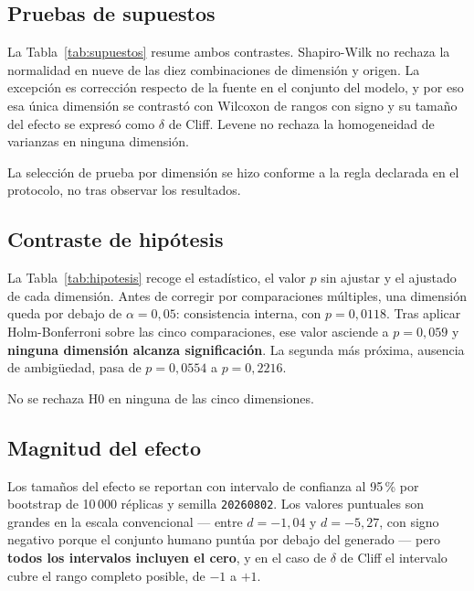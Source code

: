 \documentclass[11pt,a4paper]{article}
\begin{document}
\subsection{Pruebas de supuestos}



La Tabla~\ref{tab:supuestos} resume ambos contrastes. Shapiro-Wilk no rechaza la normalidad en nueve de las diez combinaciones de dimensi\'on
y origen. La excepci\'on es correcci\'on respecto de la fuente en el conjunto del
modelo, y por eso esa \'unica dimensi\'on se contrast\'o con Wilcoxon de rangos con
signo y su tama\~no del efecto se expres\'o como $\delta$ de Cliff. Levene no rechaza la
homogeneidad de varianzas en ninguna dimensi\'on.

La selecci\'on de prueba por dimensi\'on se hizo conforme a la regla declarada en el
protocolo, no tras observar los resultados.

\subsection{Contraste de hip\'otesis}



La Tabla~\ref{tab:hipotesis} recoge el estad\'istico, el valor $p$ sin ajustar y el ajustado de cada dimensi\'on. Antes de corregir por comparaciones m\'ultiples, una dimensi\'on queda por debajo de
$\alpha = 0{,}05$: consistencia interna, con $p = 0{,}0118$. Tras aplicar
Holm-Bonferroni sobre las cinco comparaciones, ese valor asciende a $p = 0{,}059$ y
\textbf{ninguna dimensi\'on alcanza significaci\'on}. La segunda m\'as pr\'oxima,
ausencia de ambig\"uedad, pasa de $p = 0{,}0554$ a $p = 0{,}2216$.

No se rechaza H0 en ninguna de las cinco dimensiones.

\subsection{Magnitud del efecto}

Los tama\~nos del efecto se reportan con intervalo de confianza al 95\,\% por bootstrap
de 10\,000 r\'eplicas y semilla \texttt{20260802}. Los valores puntuales son grandes en
la escala convencional --- entre $d = -1{,}04$ y $d = -5{,}27$, con signo negativo
porque el conjunto humano punt\'ua por debajo del generado --- pero
\textbf{todos los intervalos incluyen el cero}, y en el caso de $\delta$ de Cliff el
intervalo cubre el rango completo posible, de $-1$ a $+1$.
\end{document}
